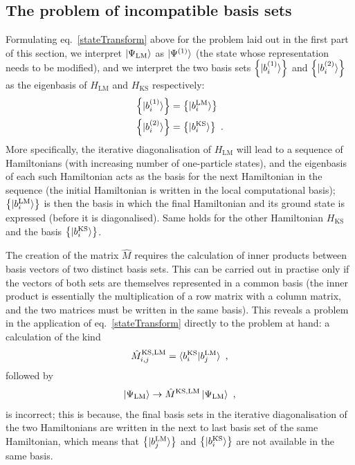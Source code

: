 \documentclass[reprint]{revtex4-2}
\begin{document}
\subsection{The problem of incompatible basis sets}
Formulating eq.~\ref{stateTransform} above for the problem laid out in the first part of this section, we interpret \(\ket{\Psi_\text{LM}}\) as \(\ket{\Psi^{(1)}}\) (the state whose representation needs to be modified), and we interpret the two basis sets \(\left\{ \ket{b^{(1)}_i}\right\}\) and \(\left\{ \ket{b^{(2)}_i}\right\}\) as the eigenbasis of \(H_\text{LM}\) and \(H_\text{KS}\) respectively:
\begin{equation}\begin{aligned}
	\left\{ \ket{b^{(1)}_i}\right\} &= \left\{ \ket{b^{\text{LM}}_i}\right\}\\
	\left\{ \ket{b^{(2)}_i}\right\} &= \left\{ \ket{b^{\text{KS}}_i}\right\}~.
\end{aligned}\end{equation}
More specifically, the iterative diagonalisation of \(H_\text{LM}\) will lead to a sequence of Hamiltonians (with increasing number of one-particle states), and the eigenbasis of each such Hamiltonian acts as the basis for the next Hamiltonian in the sequence (the initial Hamiltonian is written in the local computational basis); \(\left\{ \ket{b^{\text{LM}}_i}\right\}\) is then the basis in which the final Hamiltonian and its ground state is expressed (before it is diagonalised). Same holds for the other Hamiltonian \(H_\text{KS}\) and the basis \(\left\{ \ket{b^{\text{KS}}_i}\right\}\).

The creation of the matrix \(\hat M\) requires the calculation of inner products between basis vectors of two distinct basis sets. This can be carried out in practise only if the vectors of both sets are themselves represented in a common basis (the inner product is essentially the multiplication of a row matrix with a column matrix, and the two matrices must be written in the same basis). This reveals a problem in the application of eq.~\ref{stateTransform} directly to the problem at hand: a calculation of the kind 
\begin{equation}\begin{aligned}
	\hat M^{\text{KS}, \text{LM}}_{i,j} = \braket{b^{\text{KS}}_i | b^{\text{LM}}_j}~,
\end{aligned}\end{equation}
followed by
\begin{equation}\begin{aligned}
	 \ket{\Psi_\text{LM}} \to \hat M^{\text{KS},\text{LM}}\ket{\Psi_\text{LM}}~,
\end{aligned}\end{equation}
is incorrect; this is because, the final basis sets in the iterative diagonalisation of the two Hamiltonians are written in the next to last basis set of the same Hamiltonian, which means that \(\left\{ \ket{b^{\text{LM}}_j}\right\}\) and \(\left\{ \ket{b^{\text{KS}}_i}\right\}\) are not available in the same basis.
\end{document}

